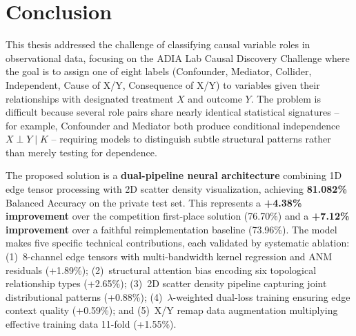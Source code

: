 \chapter*{Conclusion}
\label{chap:conclusion}

This thesis addressed the challenge of classifying causal variable roles in observational data, focusing on the ADIA Lab Causal Discovery Challenge where the goal is to assign one of eight labels (Confounder, Mediator, Collider, Independent, Cause of X/Y, Consequence of X/Y) to variables given their relationships with designated treatment $X$ and outcome $Y$. The problem is difficult because several role pairs share nearly identical statistical signatures -- for example, Confounder and Mediator both produce conditional independence $X \perp Y \mid K$ -- requiring models to distinguish subtle structural patterns rather than merely testing for dependence.

The proposed solution is a \textbf{dual-pipeline neural architecture} combining 1D edge tensor processing with 2D scatter density visualization, achieving \textbf{81.082\%} Balanced Accuracy on the private test set. This represents a \textbf{+4.38\% improvement} over the competition first-place solution (76.70\%) and a \textbf{+7.12\% improvement} over a faithful reimplementation baseline (73.96\%). The model makes five specific technical contributions, each validated by systematic ablation: (1)~8-channel edge tensors with multi-bandwidth kernel regression and ANM residuals (+1.89\%); (2)~structural attention bias encoding six topological relationship types (+2.65\%); (3)~2D scatter density pipeline capturing joint distributional patterns (+0.88\%); (4)~$\lambda$-weighted dual-loss training ensuring edge context quality (+0.59\%); and (5)~X/Y remap data augmentation multiplying effective training data 11-fold (+1.55\%).

